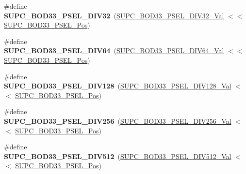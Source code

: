 \begin{DoxyCompactItemize}
\item 
\hypertarget{group___s_a_m_l21___s_u_p_c_ga2e5eb372f23ced040b0965f6f196757b}{}\#define {\bfseries S\+U\+P\+C\+\_\+\+B\+O\+D33\+\_\+\+P\+S\+E\+L\+\_\+\+D\+I\+V32}~(\hyperlink{group___s_a_m_l21___s_u_p_c_gae457def5029205484b89fc8f2f00f2dd}{S\+U\+P\+C\+\_\+\+B\+O\+D33\+\_\+\+P\+S\+E\+L\+\_\+\+D\+I\+V32\+\_\+\+Val}     $<$$<$ \hyperlink{group___s_a_m_l21___s_u_p_c_ga749aed0ecd13c1a62c80e107cfe7e31f}{S\+U\+P\+C\+\_\+\+B\+O\+D33\+\_\+\+P\+S\+E\+L\+\_\+\+Pos})\label{group___s_a_m_l21___s_u_p_c_ga2e5eb372f23ced040b0965f6f196757b}

\item 
\hypertarget{group___s_a_m_l21___s_u_p_c_ga1cec91d5977083e9635879f97faab270}{}\#define {\bfseries S\+U\+P\+C\+\_\+\+B\+O\+D33\+\_\+\+P\+S\+E\+L\+\_\+\+D\+I\+V64}~(\hyperlink{group___s_a_m_l21___s_u_p_c_gaf0abecaf750f836e619ff4b5b8d3ea25}{S\+U\+P\+C\+\_\+\+B\+O\+D33\+\_\+\+P\+S\+E\+L\+\_\+\+D\+I\+V64\+\_\+\+Val}     $<$$<$ \hyperlink{group___s_a_m_l21___s_u_p_c_ga749aed0ecd13c1a62c80e107cfe7e31f}{S\+U\+P\+C\+\_\+\+B\+O\+D33\+\_\+\+P\+S\+E\+L\+\_\+\+Pos})\label{group___s_a_m_l21___s_u_p_c_ga1cec91d5977083e9635879f97faab270}

\item 
\hypertarget{group___s_a_m_l21___s_u_p_c_ga1e71a02a954d79a928f0432b5e8262b3}{}\#define {\bfseries S\+U\+P\+C\+\_\+\+B\+O\+D33\+\_\+\+P\+S\+E\+L\+\_\+\+D\+I\+V128}~(\hyperlink{group___s_a_m_l21___s_u_p_c_gad1c45a9c7423dd4967f6e0f68ee33383}{S\+U\+P\+C\+\_\+\+B\+O\+D33\+\_\+\+P\+S\+E\+L\+\_\+\+D\+I\+V128\+\_\+\+Val}    $<$$<$ \hyperlink{group___s_a_m_l21___s_u_p_c_ga749aed0ecd13c1a62c80e107cfe7e31f}{S\+U\+P\+C\+\_\+\+B\+O\+D33\+\_\+\+P\+S\+E\+L\+\_\+\+Pos})\label{group___s_a_m_l21___s_u_p_c_ga1e71a02a954d79a928f0432b5e8262b3}

\item 
\hypertarget{group___s_a_m_l21___s_u_p_c_ga8018833b1b3907322335931cb5e795c5}{}\#define {\bfseries S\+U\+P\+C\+\_\+\+B\+O\+D33\+\_\+\+P\+S\+E\+L\+\_\+\+D\+I\+V256}~(\hyperlink{group___s_a_m_l21___s_u_p_c_ga446e919241877b5edb121c7cd614ba1a}{S\+U\+P\+C\+\_\+\+B\+O\+D33\+\_\+\+P\+S\+E\+L\+\_\+\+D\+I\+V256\+\_\+\+Val}    $<$$<$ \hyperlink{group___s_a_m_l21___s_u_p_c_ga749aed0ecd13c1a62c80e107cfe7e31f}{S\+U\+P\+C\+\_\+\+B\+O\+D33\+\_\+\+P\+S\+E\+L\+\_\+\+Pos})\label{group___s_a_m_l21___s_u_p_c_ga8018833b1b3907322335931cb5e795c5}

\item 
\hypertarget{group___s_a_m_l21___s_u_p_c_ga194bb6e9bce09ab9415a5d267780394b}{}\#define {\bfseries S\+U\+P\+C\+\_\+\+B\+O\+D33\+\_\+\+P\+S\+E\+L\+\_\+\+D\+I\+V512}~(\hyperlink{group___s_a_m_l21___s_u_p_c_ga2230cd2fc2c3877a170c738dc57b3bab}{S\+U\+P\+C\+\_\+\+B\+O\+D33\+\_\+\+P\+S\+E\+L\+\_\+\+D\+I\+V512\+\_\+\+Val}    $<$$<$ \hyperlink{group___s_a_m_l21___s_u_p_c_ga749aed0ecd13c1a62c80e107cfe7e31f}{S\+U\+P\+C\+\_\+\+B\+O\+D33\+\_\+\+P\+S\+E\+L\+\_\+\+Pos})\label{group___s_a_m_l21___s_u_p_c_ga194bb6e9bce09ab9415a5d267780394b}


\end{DoxyCompactItemize}
